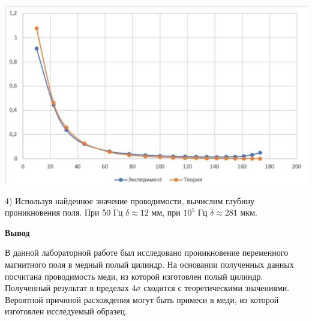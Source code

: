 \documentclass[a4paper,12pt]{report}
\begin{document}
\begin{center}
	\includegraphics[width=1.0\textwidth]{третий график.jpg}
\end{center}

4) Используя найденное значение проводимости, вычислим глубину проникновения поля. При 50 Гц $\delta \approx 12 \text{ мм}$, при $10^5$ Гц $\delta \approx 281 \text{ мкм}$.

\noindent\textbf{Вывод}

В данной лабораторной работе был исследовано проникновение переменного магнитного поля в медный полый цилиндр. На основании полученных данных посчитана проводимость меди, из которой изготовлен полый цилиндр. Полученный результат в пределах 4\(\sigma\) сходится с теоретическими значениями. Вероятной причиной расхождения могут быть примеси в меди, из которой изготовлен исследуемый образец.
\end{document}
